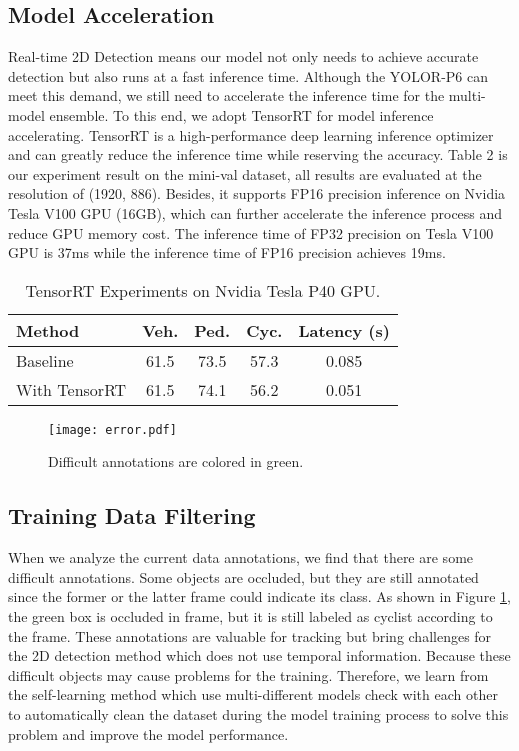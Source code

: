 \documentclass[final]{cvpr}
\begin{document}
\subsection{Model Acceleration}
Real-time 2D Detection means our model not only needs to achieve accurate detection but also runs at a fast inference time. Although the YOLOR-P6 \cite{wang2021you} can meet this demand, we still need to accelerate the inference time for the multi-model ensemble. To this end, we adopt TensorRT for model inference accelerating. TensorRT is a high-performance deep learning inference optimizer and can greatly reduce the inference time while reserving the accuracy. Table 2 is our experiment result on the mini-val dataset, all results are evaluated at the resolution of (1920, 886). Besides, it supports FP16 precision inference on Nvidia Tesla V100 GPU (16GB), which can further accelerate the inference process and reduce GPU memory cost. The inference time of FP32 precision on Tesla V100 GPU is 37ms while the inference time of FP16 precision achieves 19ms. 

\begin{table}[h]
\begin{center}
\caption{TensorRT Experiments on Nvidia Tesla P40 GPU.}
\begin{tabular}{l|c|c|c|c}
\hline
Method  & Veh. & Ped. & Cyc. & Latency (s) \\
\hline
Baseline & 61.5 & 73.5 & 57.3 &  0.085 \\
With TensorRT & 61.5 & 74.1 & 56.2 & 0.051 \\
\hline
\end{tabular}
\label{tensorrtresult}
\end{center}
\end{table}

\begin{figure}
    \centering
    \texttt{[image: error.pdf]}
    \caption{Difficult annotations are colored in green.}
    \label{error}
\end{figure}
\subsection{Training Data Filtering}
When we analyze the current data annotations, we find that there are some difficult annotations. Some objects are occluded, but they are still annotated since the former or the latter frame could indicate its class. As shown in Figure \ref{error}, the green box is occluded in  frame, but it is still labeled as cyclist according to the  frame. These annotations are valuable for tracking but bring challenges for the 2D detection method which does not use temporal information. Because these difficult objects may cause problems for the training. Therefore, we learn from the self-learning method which use multi-different models check with each other to automatically clean the dataset during the model training process to solve this problem and improve the model performance.
\end{document}
